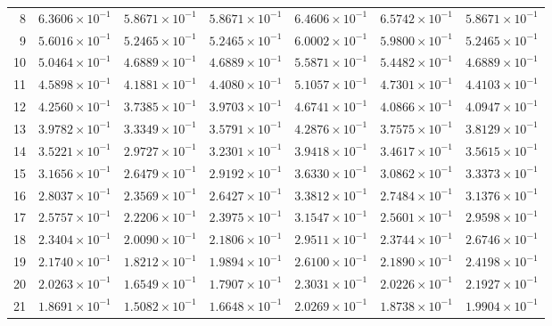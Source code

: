 \begin{table}[H]
\begin{tabular}{@{}rrrrrrr@{}}
8 & $6.3606\times10^{-1}$ & $5.8671\times10^{-1}$ & $5.8671\times10^{-1}$ & $6.4606\times10^{-1}$ & $6.5742\times10^{-1}$ & $5.8671\times10^{-1}$\\
9 & $5.6016\times10^{-1}$ & $5.2465\times10^{-1}$ & $5.2465\times10^{-1}$ & $6.0002\times10^{-1}$ & $5.9800\times10^{-1}$ & $5.2465\times10^{-1}$\\
10 & $5.0464\times10^{-1}$ & $4.6889\times10^{-1}$ & $4.6889\times10^{-1}$ & $5.5871\times10^{-1}$ & $5.4482\times10^{-1}$ & $4.6889\times10^{-1}$\\
11 & $4.5898\times10^{-1}$ & $4.1881\times10^{-1}$ & $4.4080\times10^{-1}$ & $5.1057\times10^{-1}$ & $4.7301\times10^{-1}$ & $4.4103\times10^{-1}$\\
12 & $4.2560\times10^{-1}$ & $3.7385\times10^{-1}$ & $3.9703\times10^{-1}$ & $4.6741\times10^{-1}$ & $4.0866\times10^{-1}$ & $4.0947\times10^{-1}$\\
13 & $3.9782\times10^{-1}$ & $3.3349\times10^{-1}$ & $3.5791\times10^{-1}$ & $4.2876\times10^{-1}$ & $3.7575\times10^{-1}$ & $3.8129\times10^{-1}$\\
14 & $3.5221\times10^{-1}$ & $2.9727\times10^{-1}$ & $3.2301\times10^{-1}$ & $3.9418\times10^{-1}$ & $3.4617\times10^{-1}$ & $3.5615\times10^{-1}$\\
15 & $3.1656\times10^{-1}$ & $2.6479\times10^{-1}$ & $2.9192\times10^{-1}$ & $3.6330\times10^{-1}$ & $3.0862\times10^{-1}$ & $3.3373\times10^{-1}$\\
16 & $2.8037\times10^{-1}$ & $2.3569\times10^{-1}$ & $2.6427\times10^{-1}$ & $3.3812\times10^{-1}$ & $2.7484\times10^{-1}$ & $3.1376\times10^{-1}$\\
17 & $2.5757\times10^{-1}$ & $2.2206\times10^{-1}$ & $2.3975\times10^{-1}$ & $3.1547\times10^{-1}$ & $2.5601\times10^{-1}$ & $2.9598\times10^{-1}$\\
18 & $2.3404\times10^{-1}$ & $2.0090\times10^{-1}$ & $2.1806\times10^{-1}$ & $2.9511\times10^{-1}$ & $2.3744\times10^{-1}$ & $2.6746\times10^{-1}$\\
19 & $2.1740\times10^{-1}$ & $1.8212\times10^{-1}$ & $1.9894\times10^{-1}$ & $2.6100\times10^{-1}$ & $2.1890\times10^{-1}$ & $2.4198\times10^{-1}$\\
20 & $2.0263\times10^{-1}$ & $1.6549\times10^{-1}$ & $1.7907\times10^{-1}$ & $2.3031\times10^{-1}$ & $2.0226\times10^{-1}$ & $2.1927\times10^{-1}$\\
21 & $1.8691\times10^{-1}$ & $1.5082\times10^{-1}$ & $1.6648\times10^{-1}$ & $2.0269\times10^{-1}$ & $1.8738\times10^{-1}$ & $1.9904\times10^{-1}$\\

\end{tabular}
\end{table}

